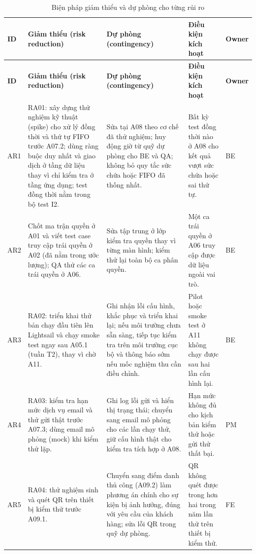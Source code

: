 {\small
\begin{longtable}{@{}Y{1.0cm}Y{4.1cm}Y{4.2cm}Y{3.1cm}Y{1.3cm}@{}}
\caption{Biện pháp giảm thiểu và dự phòng cho từng rủi ro}\label{tab:p28-response}\\
\toprule
\textbf{ID} & \textbf{Giảm thiểu (risk reduction)} & \textbf{Dự phòng (contingency)} & \textbf{Điều kiện kích hoạt} & \textbf{Owner} \\
\midrule
\endfirsthead
\toprule
\textbf{ID} & \textbf{Giảm thiểu (risk reduction)} & \textbf{Dự phòng (contingency)} & \textbf{Điều kiện kích hoạt} & \textbf{Owner} \\
\midrule
\endhead
\bottomrule
\endfoot
AR1 &
RA01: xây dựng thử nghiệm kỹ thuật (spike) cho xử lý đồng thời và thứ tự FIFO trước A07.2; dùng ràng buộc duy nhất và giao dịch ở tầng dữ liệu thay vì chỉ kiểm tra ở tầng ứng dụng; test đồng thời nằm trong bộ test I2. &
Sửa tại A08 theo cơ chế đã thử nghiệm; huy động giờ từ quỹ dự phòng cho BE và QA; không bỏ quy tắc sức chứa hoặc FIFO đã thống nhất. &
Bất kỳ test đồng thời nào ở A08 cho kết quả vượt sức chứa hoặc sai thứ tự. & BE \\
\addlinespace
AR2 &
Chốt ma trận quyền ở A01 và viết test case truy cập trái quyền ở A02 (đã nằm trong ước lượng); QA thử các ca trái quyền ở A06. &
Sửa tập trung ở lớp kiểm tra quyền thay vì từng màn hình; kiểm thử lại toàn bộ ca phân quyền. &
Một ca trái quyền ở A06 truy cập được dữ liệu ngoài vai trò. & BE \\
\addlinespace
AR3 &
RA02: triển khai thử bản chạy đầu tiên lên Lightsail và chạy smoke test ngay sau A05.1 (tuần T2), thay vì chờ A11. &
Ghi nhận lỗi cấu hình, khắc phục và triển khai lại; nếu môi trường chưa sẵn sàng, tiếp tục kiểm tra trên môi trường cục bộ và thông báo sớm nếu mốc nghiệm thu cần điều chỉnh. &
Pilot hoặc smoke test ở A11 không chạy được sau hai lần cấu hình lại. & BE \\
\addlinespace
AR4 &
RA03: kiểm tra hạn mức dịch vụ email và thử gửi thật trước A07.3; dùng email mô phỏng (mock) khi kiểm thử lặp. &
Ghi log lỗi gửi và hiển thị trạng thái; chuyển sang email mô phỏng cho các lần chạy thử, giữ cấu hình thật cho kiểm tra tích hợp ở A08. &
Hạn mức không đủ cho kịch bản kiểm thử hoặc gửi thử thất bại. & PM \\
\addlinespace
AR5 &
RA04: thử nghiệm sinh và quét QR trên thiết bị kiểm thử trước A09.1. &
Chuyển sang điểm danh thủ công (A09.2) làm phương án chính cho sự kiện bị ảnh hưởng, đúng với yêu cầu của khách hàng; sửa lỗi QR trong quỹ dự phòng. &
QR không quét được trong hơn hai trong năm lần thử trên thiết bị kiểm thử. & FE \\

\end{longtable}}

